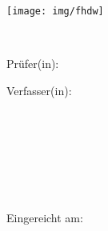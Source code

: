 
\begin{titlepage}
\begin{center}

\texttt{[image: img/fhdw]}\\

\vspace{7mm}

\Huge{\bfseries\dokumententyp}

\vspace{5mm}\\

\LARGE{\dokumententitel}


\large{

\vspace{15mm}

Prüfer(in):\\

\dokumentenpruefer

\vspace{15mm}

Verfasser(in):\\

\dokumentenautor\\

\martikelnummer\\

\vspace{3mm}

\dokumentenautoradress\\

\vspace{7mm}

\studiengang\\

\spezialisierungsbereich\\

\enlargethispage{2em}

\vspace{10mm}

Eingereicht am:\vspace{1mm}\\

\abgabedatum

}

\end{center}


\end{titlepage}

